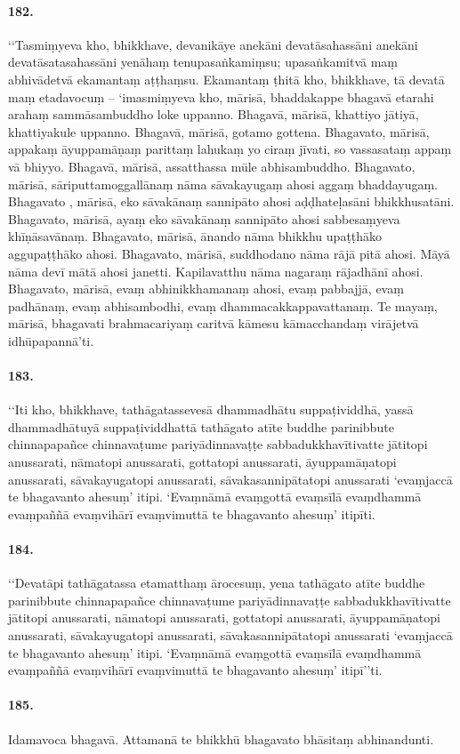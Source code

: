 \paragraph{182.} ‘‘Tasmiṃyeva kho, bhikkhave, devanikāye anekāni devatāsahassāni anekāni devatāsatasahassāni yenāhaṃ tenupasaṅkamiṃsu; upasaṅkamitvā maṃ abhivādetvā ekamantaṃ aṭṭhaṃsu. Ekamantaṃ ṭhitā kho, bhikkhave, tā devatā maṃ etadavocuṃ – ‘imasmiṃyeva kho, mārisā, bhaddakappe bhagavā etarahi arahaṃ sammāsambuddho loke uppanno. Bhagavā, mārisā, khattiyo jātiyā, khattiyakule uppanno. Bhagavā, mārisā, gotamo gottena. Bhagavato, mārisā, appakaṃ āyuppamāṇaṃ parittaṃ lahukaṃ yo ciraṃ jīvati, so vassasataṃ appaṃ vā bhiyyo. Bhagavā, mārisā, assatthassa mūle abhisambuddho. Bhagavato, mārisā, sāriputtamoggallānaṃ nāma sāvakayugaṃ ahosi aggaṃ bhaddayugaṃ. Bhagavato , mārisā, eko sāvakānaṃ sannipāto ahosi aḍḍhateḷasāni bhikkhusatāni. Bhagavato, mārisā, ayaṃ eko sāvakānaṃ sannipāto ahosi sabbesaṃyeva khīṇāsavānaṃ. Bhagavato, mārisā, ānando nāma bhikkhu upaṭṭhāko aggupaṭṭhāko ahosi. Bhagavato, mārisā, suddhodano nāma rājā pitā ahosi. Māyā nāma devī mātā ahosi janetti. Kapilavatthu nāma nagaraṃ rājadhānī ahosi. Bhagavato, mārisā, evaṃ abhinikkhamanaṃ ahosi, evaṃ pabbajjā, evaṃ padhānaṃ, evaṃ abhisambodhi, evaṃ dhammacakkappavattanaṃ. Te mayaṃ, mārisā, bhagavati brahmacariyaṃ caritvā kāmesu kāmacchandaṃ virājetvā idhūpapannā’ti.

\paragraph{183.} ‘‘Iti kho, bhikkhave, tathāgatassevesā dhammadhātu suppaṭividdhā, yassā dhammadhātuyā suppaṭividdhattā tathāgato atīte buddhe parinibbute chinnapapañce chinnavaṭume pariyādinnavaṭṭe sabbadukkhavītivatte jātitopi anussarati, nāmatopi anussarati, gottatopi anussarati, āyuppamāṇatopi anussarati, sāvakayugatopi anussarati, sāvakasannipātatopi anussarati ‘evaṃjaccā te bhagavanto ahesuṃ’ itipi. ‘Evaṃnāmā evaṃgottā evaṃsīlā evaṃdhammā evaṃpaññā evaṃvihārī evaṃvimuttā te bhagavanto ahesuṃ’ itipīti.

\paragraph{184.} ‘‘Devatāpi tathāgatassa etamatthaṃ ārocesuṃ, yena tathāgato atīte buddhe parinibbute chinnapapañce chinnavaṭume pariyādinnavaṭṭe sabbadukkhavītivatte jātitopi anussarati, nāmatopi anussarati, gottatopi anussarati, āyuppamāṇatopi anussarati, sāvakayugatopi anussarati, sāvakasannipātatopi anussarati ‘evaṃjaccā te bhagavanto ahesuṃ’ itipi. ‘Evaṃnāmā evaṃgottā evaṃsīlā evaṃdhammā evaṃpaññā evaṃvihārī evaṃvimuttā te bhagavanto ahesuṃ’ itipī’’ti.

\paragraph{185.} Idamavoca bhagavā. Attamanā te bhikkhū bhagavato bhāsitaṃ abhinandunti.

